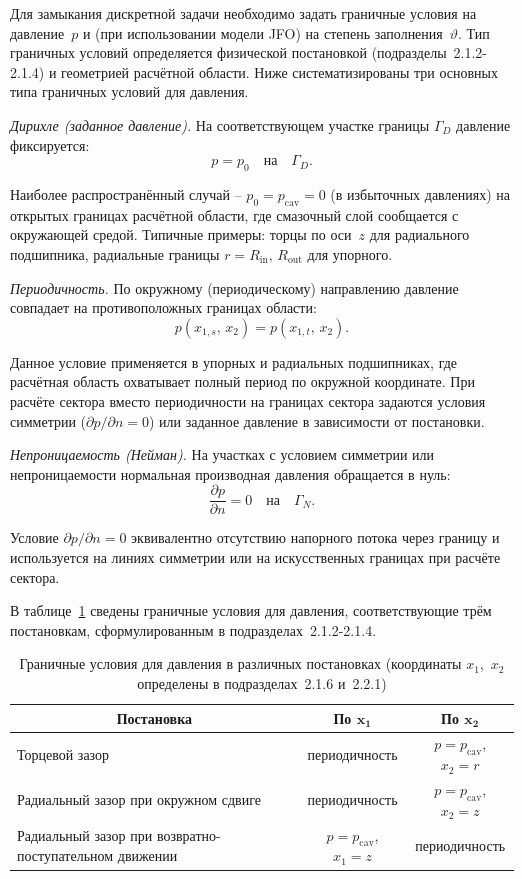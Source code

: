 Для замыкания дискретной задачи необходимо задать граничные условия на давление~$p$ и (при использовании модели JFO) на степень заполнения~$\vartheta$. Тип граничных условий определяется физической постановкой (подразделы~2.1.2-2.1.4) и геометрией расчётной области. Ниже систематизированы три основных типа граничных условий для давления.

\textit{Дирихле (заданное давление).}
На соответствующем участке границы $\Gamma_D$ давление фиксируется:
\[
  p = p_0 \quad \text{на} \quad \Gamma_D.
\]

Наиболее распространённый случай -- $p_0 = p_{\mathrm{cav}} = 0$ (в избыточных давлениях) на открытых границах расчётной области, где смазочный слой сообщается с окружающей средой. Типичные примеры: торцы по оси~$z$ для радиального подшипника, радиальные границы $r = R_{\mathrm{in}},\, R_{\mathrm{out}}$ для упорного.

\textit{Периодичность.}
По окружному (периодическому) направлению давление совпадает на противоположных границах области:
\[
  p(x_{1,s},\, x_2) = p(x_{1,t},\, x_2).
\]

Данное условие применяется в упорных и радиальных подшипниках, где расчётная область охватывает полный период по окружной координате. При расчёте сектора вместо периодичности на границах сектора задаются условия симметрии ($\partial p / \partial n = 0$) или заданное давление в зависимости от постановки.

\textit{Непроницаемость (Нейман).}
На участках с условием симметрии или непроницаемости нормальная производная давления обращается в нуль:
\[
  \frac{\partial p}{\partial n} = 0 \quad \text{на} \quad \Gamma_N.
\]

Условие $\partial p / \partial n = 0$ эквивалентно отсутствию напорного потока через границу и используется на линиях симметрии или на искусственных границах при расчёте сектора.

В таблице~\ref{tab:bc_summary} сведены граничные условия для давления, соответствующие трём постановкам, сформулированным в подразделах~2.1.2-2.1.4.

\begin{table}[!ht]
\centering
\caption{Граничные условия для давления в различных постановках
  (координаты $x_1$,~$x_2$ определены в подразделах~2.1.6 и~2.2.1)}
\label{tab:bc_summary}
\begin{tabularx}{\textwidth}{|X|c|c|}
\hline
\multicolumn{1}{|c|}{\textbf{Постановка}} & \textbf{По $\boldsymbol{x_1}$}
                       & \textbf{По $\boldsymbol{x_2}$} \\
\hline
Торцевой зазор
  & периодичность
  & $p = p_{\mathrm{cav}}$, $x_2 = r$ \\
\hline
Радиальный зазор при окружном сдвиге
  & периодичность
  & $p = p_{\mathrm{cav}}$, $x_2 = z$ \\
\hline
Радиальный зазор при возвратно-поступательном движении
  & $p = p_{\mathrm{cav}}$, $x_1 = z$
  & периодичность \\
\hline
\end{tabularx}
\end{table}

